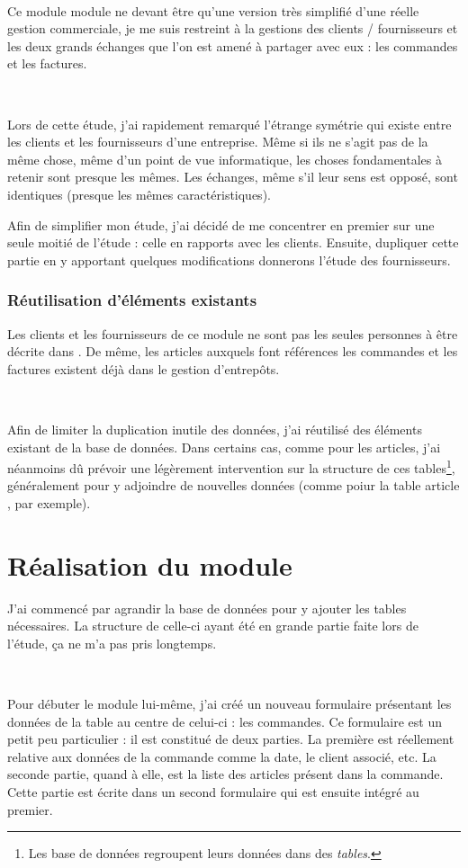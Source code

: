 ~

Ce module module ne devant être qu'une version très simplifié d'une \og réelle \fg{} gestion commerciale, je me suis restreint à la gestions des clients / fournisseurs et les deux grands échanges que l'on est amené à partager avec eux : les commandes et les factures.

~

Lors de cette étude, j'ai rapidement remarqué l'étrange symétrie qui existe entre les clients et les fournisseurs d'une entreprise. Même si ils ne s'agit pas de la même chose, même d'un point de vue informatique, les choses fondamentales à retenir sont presque les mêmes. Les échanges, même s'il leur sens est opposé, sont identiques (presque les mêmes caractéristiques).

Afin de simplifier mon étude, j'ai décidé de me concentrer en premier sur une seule moitié de l'étude : celle en rapports avec les clients. Ensuite, dupliquer cette partie en y apportant quelques modifications donnerons l'étude des fournisseurs.

\subsubsection{Réutilisation d'éléments existants}
Les clients et les fournisseurs de ce module ne sont pas les seules \og personnes \fg{} à être décrite dans \integrale. De même, les articles auxquels font références les commandes et les factures existent déjà dans le gestion d'entrepôts.

~

Afin de limiter la duplication inutile des données, j'ai réutilisé des éléments existant de la base de données. Dans certains cas, comme pour les articles, j'ai néanmoins dû prévoir une légèrement intervention sur la structure de ces tables\footnote{Les base de données regroupent leurs données dans des \emph{tables}.}, généralement pour y adjoindre de nouvelles données (comme poiur la table \og article \fg, par exemple).

\section{Réalisation du module}
J'ai commencé par agrandir la base de données pour y ajouter les tables nécessaires. La structure de celle-ci ayant été en grande partie faite lors de l'étude, ça ne m'a pas pris longtemps.

~

Pour débuter le module lui-même, j'ai créé un nouveau formulaire présentant les données de la table au centre de celui-ci : les commandes. Ce formulaire est un petit peu particulier : il est constitué de deux parties. La première est réellement relative aux données de la commande comme la date, le client associé, etc. La seconde partie, quand à elle, est la liste des articles présent dans la commande. Cette partie est écrite dans un second formulaire qui est ensuite intégré au premier.

